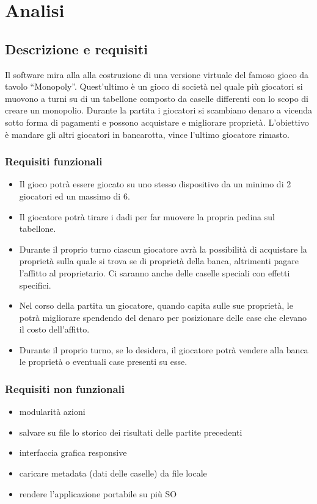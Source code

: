 \chapter{Analisi}

\section{Descrizione e requisiti}

Il software mira alla alla costruzione di una versione virtuale del famoso gioco da tavolo “Monopoly”. 
Quest’ultimo è un gioco di società nel quale più giocatori si muovono a turni su di un tabellone 
composto da caselle differenti con lo scopo di creare un monopolio. 
Durante la partita i giocatori si scambiano denaro a vicenda sotto 
forma di pagamenti e possono acquistare e migliorare proprietà. 
L’obiettivo è mandare gli altri giocatori in bancarotta, vince l’ultimo giocatore rimasto. 




\subsection*{Requisiti funzionali}
\begin{itemize}
    \item Il gioco potrà essere giocato su uno stesso dispositivo da un minimo di 2 giocatori ed un massimo di 6.
	\item Il giocatore potrà tirare i dadi per far muovere la propria pedina sul tabellone.
	\item Durante il proprio turno ciascun giocatore avrà la possibilità di acquistare la proprietà sulla quale 
    si trova se di proprietà della banca, altrimenti pagare l’affitto al proprietario. 
    Ci saranno anche delle caselle speciali con effetti specifici.
    \item Nel corso della partita un giocatore, quando capita sulle sue proprietà, le potrà migliorare spendendo
    del denaro per posizionare delle case che elevano il costo dell’affitto.
    \item Durante il proprio turno, se lo desidera, il giocatore potrà vendere alla banca 
    le proprietà o eventuali case presenti su esse.
\end{itemize}


\subsection*{Requisiti non funzionali}
\begin{itemize}
    \item modularità azioni
    \item salvare su file lo storico dei risultati delle partite precedenti
    \item interfaccia grafica responsive
    \item caricare metadata (dati delle caselle) da file locale
    \item rendere l’applicazione portabile su più SO
\end{itemize}

